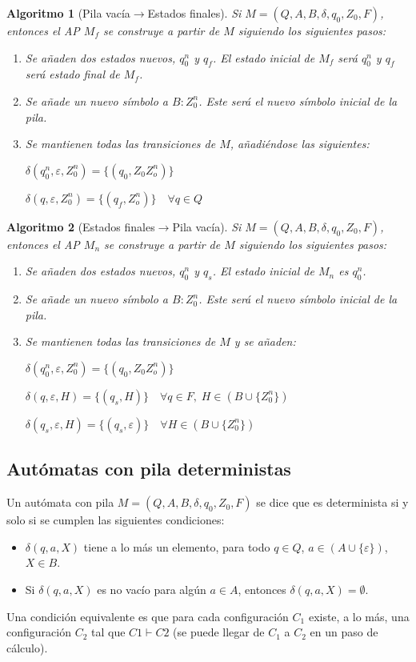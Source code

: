 \documentclass[11pt,titlepage,a4paper]{article}
\theoremstyle{ejemplo}
\theoremstyle{algoritmo}
\newtheorem*{alg}{Algoritmo} %
\begin{document}
\begin{alg}[Pila vacía$\to$Estados finales]
Si $M=(Q,A,B,\delta,q_0,Z_0,F)$, entonces el AP $M_f$ se construye a
partir de $M$ siguiendo los siguientes pasos:
\begin{enumerate}[noitemsep]
	\item Se añaden dos estados nuevos, $q^n_0$ y $q_f$. El estado inicial de 
	$M_f$ será $q^n_0$ y $q_f$ será estado final de $M_f$.
	\item Se añade un nuevo símbolo a $B:Z^n_0$. Este será el nuevo símbolo
	inicial de la pila.
	\item Se mantienen todas las transiciones de $M$, añadiéndose las siguientes:
	
	\quad\quad $\delta(q_0^n,\varepsilon,Z_0^n)=\{(q_0,Z_0Z_o^n)\}$
	
	\quad\quad $\delta(q,\varepsilon,Z_0^n)=\{(q_f,Z_o^n)\}\quad\forall q\in Q$
\end{enumerate}
\end{alg}

\begin{alg}[Estados finales$\to$Pila vacía]
Si $M=(Q,A,B,\delta,q_0,Z_0,F)$, entonces el AP $M_n$ se construye a
partir de $M$ siguiendo los siguientes pasos:
\begin{enumerate}[noitemsep]
	\item Se añaden dos estados nuevos, $q^n_0$ y $q_s$. El estado inicial de 
	$M_n$ es $q^n_0$.
	\item Se añade un nuevo símbolo a $B:Z^n_0$. Este será el nuevo símbolo
	inicial de la pila.
	\item Se mantienen todas las transiciones de $M$ y se añaden:
	
	\quad\quad $\delta(q_0^n,\varepsilon,Z_0^n)=\{(q_0,Z_0Z_o^n)\}$
	
	\quad\quad $\delta(q,\varepsilon,H)=\{(q_s,H)\}\quad\forall q\in F,\;H\in
	(B\cup\{Z_0^n\})$
	
	\quad\quad $\delta(q_s,\varepsilon,H)=\{(q_s,\varepsilon)\}\quad\forall
	H\in(B\cup\{Z_0^n\})$
\end{enumerate}
\end{alg}

\subsection{Autómatas con pila deterministas}

Un autómata con pila $M=(Q,A,B,\delta,q_0,Z_0,F)$ se dice que es determinista si 
y solo si se cumplen las siguientes condiciones:
\begin{itemize}[noitemsep]
	\item $\delta(q,a,X)$ tiene a lo más un elemento, para todo $q\in Q$, $a\in
	(A\cup\{\varepsilon\})$, $X\in B$.
	\item Si $\delta(q,a,X)$ es no vacío para algún $a\in A$, entonces 
	$\delta(q,a,X)=\emptyset$.
\end{itemize}
Una condición equivalente es que para cada configuración $C_1$ existe, a lo más, 
una configuración $C_2$ tal que $C1\vdash C2$ (se puede llegar de $C_1$ a $C_2$ 
en un paso de cálculo).
\\
\end{document}
